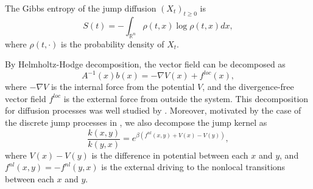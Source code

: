 \documentclass[10pt]{article}
\theoremstyle{definition}
\theoremstyle{remark}
\numberwithin{equation}{section}
\begin{document}
The Gibbs entropy of the jump diffusion $(X_t)_{t \geq 0}$ is 
\begin{equation*}
    S(t) = -\int_{\mathbb{R}^n}\rho(t,x)\log \rho(t,x) dx,
\end{equation*}
where $\rho(t,\cdot)$ is the probability density of $X_t$.

By Helmholtz-Hodge decomposition, the vector field can be decomposed as $$A^{-1}(x)b(x) = -\nabla V(x) + f^{loc}(x),$$ where $-\nabla V$ is the internal force from the potential $V$, and the divergence-free vector field $f^{loc}$ is the external force from outside the system. 
This decomposition for diffusion processes was well studied by \cite{A04, Q13}.
Moreover, motivated by the case of the discrete jump processes in \cite{MNW08}, we also decompose the jump kernel as
\begin{equation*}
    \frac{k(x,y)}{k(y,x)} = e^{\beta(f^{nl}(x,y) + V(x) - V(y))},
\end{equation*}
where $V(x) - V(y)$ is the difference in potential between each $x$ and $y$, and $f^{nl}(x,y) = -f^{nl}(y,x)$ is the external driving to the nonlocal transitions between each $x$ and $y$.
\end{document}
